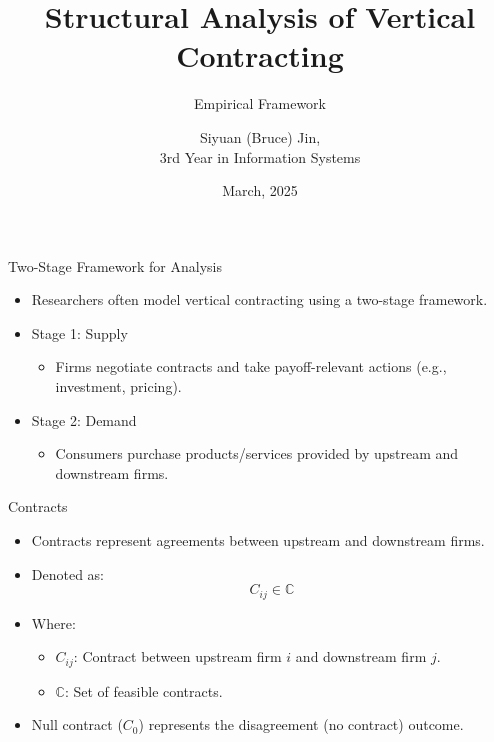 \documentclass[aspectratio=169]{beamer}  %
\title{Structural Analysis of Vertical Contracting}
\subtitle{Empirical Framework}
\author{Siyuan (Bruce) Jin,\\3rd Year in Information Systems}
\institute{Hong Kong University of Science and Technology}
\date{March, 2025}
\begin{document}
\begin{frame}
    \titlepage
\end{frame}

\begin{frame}{Two-Stage Framework for Analysis}
    \begin{itemize}
        \item Researchers often model vertical contracting using a two-stage framework.
        \item Stage 1: Supply
        \begin{itemize}
            \item Firms negotiate contracts and take payoff-relevant actions (e.g., investment, pricing).
        \end{itemize}
        \item Stage 2: Demand
        \begin{itemize}
            \item Consumers purchase products/services provided by upstream and downstream firms.
        \end{itemize}
    \end{itemize}
\end{frame}

\begin{frame}{Contracts}
    \begin{itemize}
        \item Contracts represent agreements between upstream and downstream firms.
        \item Denoted as:
        \[
        C_{ij} \in \mathbb{C}
        \]
        \item Where:
        \begin{itemize}
            \item \(C_{ij}\): Contract between upstream firm \(i\) and downstream firm \(j\).
            \item \(\mathbb{C}\): Set of feasible contracts.
        \end{itemize}
        \item Null contract (\(C_0\)) represents the disagreement (no contract) outcome.
    \end{itemize}
\end{frame}
\end{document}
